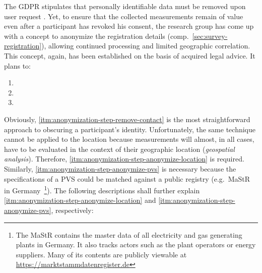 The \acs{GDPR} stipulates that personally identifiable data must be removed upon user request \cite[Art.~17,§~1]{eu2016gdpr}. Yet, to ensure that the collected measurements remain of value even after a participant has revoked his consent, the research group has come up with a concept to anonymize the registration details (comp.~\autoref{sec:survey-registration}), allowing continued processing and limited geographic correlation. This concept, again, has been established on the basis of acquired legal advice. It plans to:

\begin{enumerate}[label=(\Alph*)]
  \item {}
  \item {}
  \item {}
\end{enumerate}

Obviously, \ref{itm:anonymization-step-remove-contact} is the most straightforward approach to obscuring a participant's identity. Unfortunately, the same technique cannot be applied to the location because measurements will almost, in all cases, have to be evaluated in the context of their geographic location (\textit{geospatial analysis}). Therefore, \ref{itm:anonymization-step-anonymize-location} is required. Similarly, \ref{itm:anonymization-step-anonymize-pvs} is necessary because the specifications of a \acs{PVS} could be matched against a public registry (e.g.~\acs{MaStR} in Germany~\footnote{The \ac{MaStR} contains the master data of all electricity and gas generating plants in Germany. It also tracks actors such as the plant operators or energy suppliers. Many of its contents are publicly viewable at \url{https://marktstammdatenregister.de}}). The following descriptions shall further explain \ref{itm:anonymization-step-anonymize-location} and \ref{itm:anonymization-step-anonymize-pvs}, respectively:

